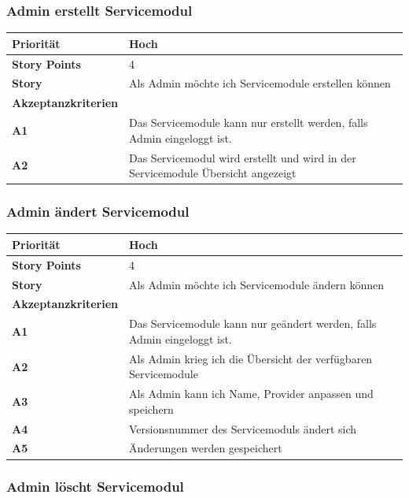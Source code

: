 \documentclass[11pt]{scrartcl}
\begin{document}
  \subsubsection{Admin erstellt Servicemodul}
\begin{tabularx}{\linewidth}{l X}
  \textbf{Priorität} & Hoch\\
  \hline
  \textbf{Story Points} & 4\\
  \hline
  \textbf{Story}& Als Admin möchte ich Servicemodule erstellen können\\
  \hline
    \textbf{Akzeptanzkriterien} & \\
    \hline
  \textbf{A1} & Das Servicemodule kann nur erstellt werden, falls Admin eingeloggt ist.\\
  \hline
  \textbf{A2} & Das Servicemodul wird erstellt und wird in der Servicemodule Übersicht angezeigt\\
  \hline
 \end{tabularx}
 
   \subsubsection{Admin ändert Servicemodul}
\begin{tabularx}{\linewidth}{l X}
  \textbf{Priorität} & Hoch\\
  \hline
  \textbf{Story Points} & 4\\
  \hline
  \textbf{Story}& Als Admin möchte ich Servicemodule ändern können\\
  \hline
    \textbf{Akzeptanzkriterien} & \\
    \hline
      \textbf{A1} & Das Servicemodule kann nur geändert werden, falls Admin eingeloggt ist.\\
  \hline
  \textbf{A2} & Als Admin krieg ich die Übersicht der verfügbaren Servicemodule\\
  \hline
  \textbf{A3} & Als Admin kann ich Name, Provider anpassen und speichern\\
  \hline
    \textbf{A4} & Versionsnummer des Servicemoduls ändert sich\\
  \hline
    \textbf{A5} & Änderungen werden gespeichert\\
  \hline
 \end{tabularx}
 
 
 \subsubsection{Admin löscht Servicemodul}
 
\end{document}
